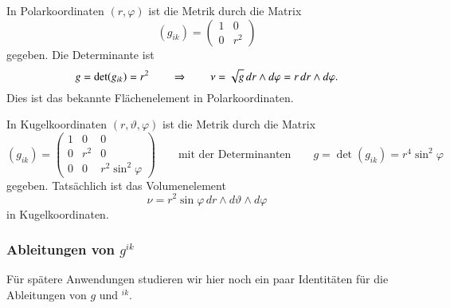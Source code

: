 \begin{beispiel}
In Polarkoordinaten $(r,\varphi)$ ist die Metrik durch die
%
Matrix
\[
(g_{ik})
=
\begin{pmatrix}
1 & 0 \\
0 & r^2
\end{pmatrix}
\]
gegeben.
Die Determinante ist
\[
g
=
\det(g_{ik})
=
r^2
\qquad
\Rightarrow
\qquad
\nu
=
\sqrt{g\mathstrut}\, dr\wedge d\varphi
=
r\,dr\wedge d\varphi.
\]
Dies ist das bekannte Flächenelement in Polarkoordinaten.
%
\end{beispiel}

\begin{beispiel}
In Kugelkoordinaten $(r,\vartheta,\varphi)$ ist die Metrik durch die
%
Matrix
\[
(g_{ik})
=
\begin{pmatrix}
1 &  0  & 0 \\
0 & r^2 & 0 \\
0 &  0  & r^2 \sin^2\varphi
\end{pmatrix}
\qquad
\text{mit der Determinanten}
\qquad
g = \det(g_{ik}) = r^4\sin^2\varphi
\]
gegeben.
Tatsächlich ist das Volumenelement 
\[
\nu 
=
r^2 \sin\varphi\,dr\wedge d\vartheta\wedge d\varphi
\]
in Kugelkoordinaten.
%
\end{beispiel}

%
%
\subsubsection{Ableitungen von $g^{ik}$}
Für spätere Anwendungen studieren wir hier noch ein paar Identitäten
für die Ableitungen von $g$ und $^{ik}$.

